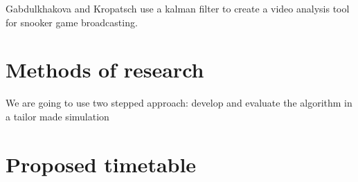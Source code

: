 \documentclass[titlepage, a4paper, 11pt]{scrartcl}
\begin{document}
\begin{multicols}{2}
    Gabdulkhakova and Kropatsch \cite{kropatsch} use a kalman filter to create a video analysis tool for snooker game broadcasting.

    \section{Methods of research}

    We are going to use two stepped approach: develop and evaluate the algorithm in a tailor made simulation 

    \section{Proposed timetable}

\end{multicols} 

 

\end{document}
